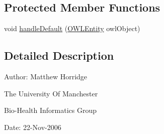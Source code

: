 \subsection*{Protected Member Functions}
\begin{DoxyCompactItemize}
\item 
void \hyperlink{classorg_1_1semanticweb_1_1owlapi_1_1util_1_1_o_w_l_entity_visitor_adapter_a18931d94a3dd10dbba78ad9a3d62f4f4}{handle\-Default} (\hyperlink{interfaceorg_1_1semanticweb_1_1owlapi_1_1model_1_1_o_w_l_entity}{O\-W\-L\-Entity} owl\-Object)
\end{DoxyCompactItemize}


\subsection{Detailed Description}
Author\-: Matthew Horridge\par
 The University Of Manchester\par
 Bio-\/\-Health Informatics Group\par
 Date\-: 22-\/\-Nov-\/2006\par
\par
 

